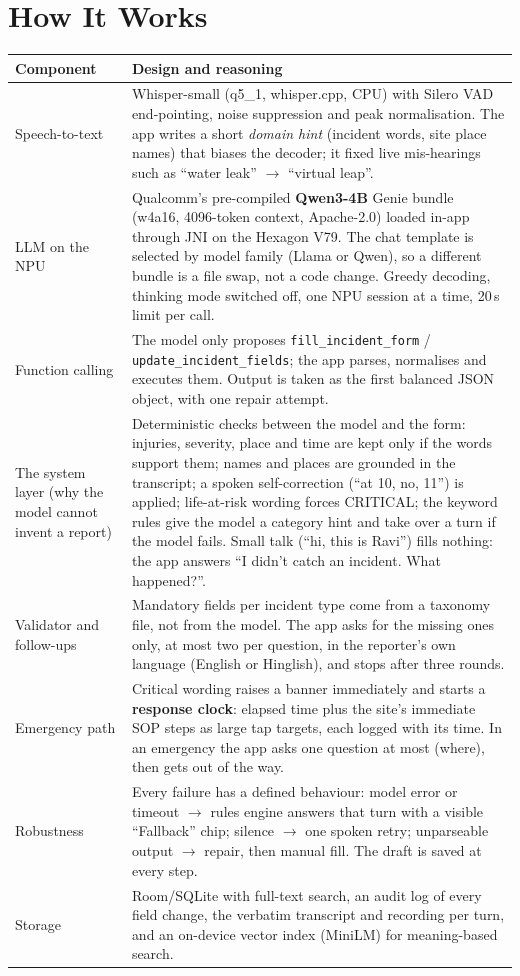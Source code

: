 \documentclass[9pt,a4paper]{extarticle}
\newcommand{\code}[1]{{\small\texttt{#1}}}
\begin{document}
\section{How It Works}
\begin{tabularx}{\linewidth}{@{}p{2.7cm}L@{}}
\toprule
\textbf{Component} & \textbf{Design and reasoning}\\
\midrule
Speech-to-text & Whisper-small (q5\_1, whisper.cpp, CPU) with Silero VAD end-pointing, noise suppression and peak normalisation. The app writes a short \emph{domain hint} (incident words, site place names) that biases the decoder; it fixed live mis-hearings such as ``water leak'' $\rightarrow$ ``virtual leap''.\\
LLM on the NPU & Qualcomm's pre-compiled \textbf{Qwen3-4B} Genie bundle (w4a16, 4096-token context, Apache-2.0) loaded in-app through JNI on the Hexagon V79. The chat template is selected by model family (Llama or Qwen), so a different bundle is a file swap, not a code change. Greedy decoding, thinking mode switched off, one NPU session at a time, 20\,s limit per call.\\
Function calling & The model only proposes \code{fill\_incident\_form} / \code{update\_incident\_fields}; the app parses, normalises and executes them. Output is taken as the first balanced JSON object, with one repair attempt.\\
The system layer (why the model cannot invent a report) & Deterministic checks between the model and the form: injuries, severity, place and time are kept only if the words support them; names and places are grounded in the transcript; a spoken self-correction (``at 10, no, 11'') is applied; life-at-risk wording forces CRITICAL; the keyword rules give the model a category hint and take over a turn if the model fails. Small talk (``hi, this is Ravi'') fills nothing: the app answers ``I didn't catch an incident. What happened?''.\\
Validator and follow-ups & Mandatory fields per incident type come from a taxonomy file, not from the model. The app asks for the missing ones only, at most two per question, in the reporter's own language (English or Hinglish), and stops after three rounds.\\
Emergency path & Critical wording raises a banner immediately and starts a \textbf{response clock}: elapsed time plus the site's immediate SOP steps as large tap targets, each logged with its time. In an emergency the app asks one question at most (where), then gets out of the way.\\
Robustness & Every failure has a defined behaviour: model error or timeout $\rightarrow$ rules engine answers that turn with a visible ``Fallback'' chip; silence $\rightarrow$ one spoken retry; unparseable output $\rightarrow$ repair, then manual fill. The draft is saved at every step.\\
Storage & Room/SQLite with full-text search, an audit log of every field change, the verbatim transcript and recording per turn, and an on-device vector index (MiniLM) for meaning-based search.\\
\bottomrule
\end{tabularx}
\end{document}
